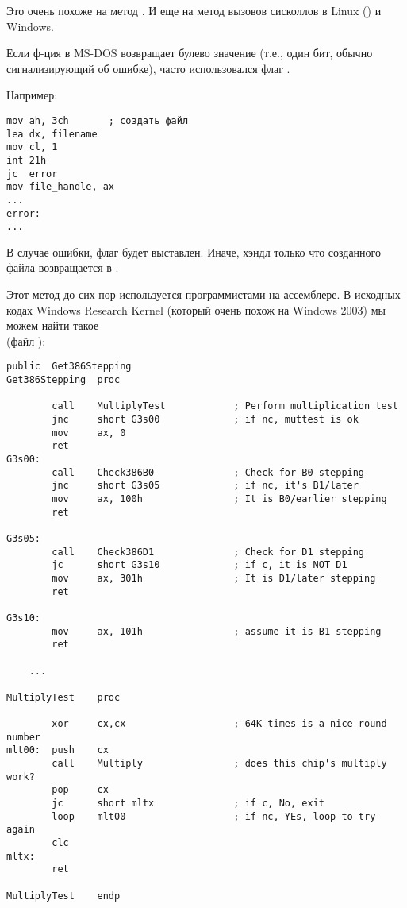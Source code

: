 Это очень похоже на метод .
И еще на метод вызовов сисколлов в Linux () и Windows.

Если ф-ция в MS-DOS возвращает булево значение (т.е., один бит, обычно сигнализирующий об ошибке),
часто использовался флаг .

Например:

\begin{lstlisting}[style=customasmx86]
mov ah, 3ch       ; создать файл
lea dx, filename
mov cl, 1
int 21h
jc  error
mov file_handle, ax
...
error:
...
\end{lstlisting}

В случае ошибки, флаг  будет выставлен.
Иначе, хэндл только что созданного файла возвращается в .

Этот метод до сих пор используется программистами на ассемблере.
В исходных кодах Windows Research Kernel (который очень похож на Windows 2003) мы можем найти такое\\
(файл ):

\begin{lstlisting}[style=customasmx86]
        public  Get386Stepping
Get386Stepping  proc

        call    MultiplyTest            ; Perform multiplication test
        jnc     short G3s00             ; if nc, muttest is ok
        mov     ax, 0
        ret
G3s00:
        call    Check386B0              ; Check for B0 stepping
        jnc     short G3s05             ; if nc, it's B1/later
        mov     ax, 100h                ; It is B0/earlier stepping
        ret

G3s05:
        call    Check386D1              ; Check for D1 stepping
        jc      short G3s10             ; if c, it is NOT D1
        mov     ax, 301h                ; It is D1/later stepping
        ret

G3s10:
        mov     ax, 101h                ; assume it is B1 stepping
        ret

	...

MultiplyTest    proc

        xor     cx,cx                   ; 64K times is a nice round number
mlt00:  push    cx
        call    Multiply                ; does this chip's multiply work?
        pop     cx
        jc      short mltx              ; if c, No, exit
        loop    mlt00                   ; if nc, YEs, loop to try again
        clc
mltx:
        ret

MultiplyTest    endp
\end{lstlisting}


